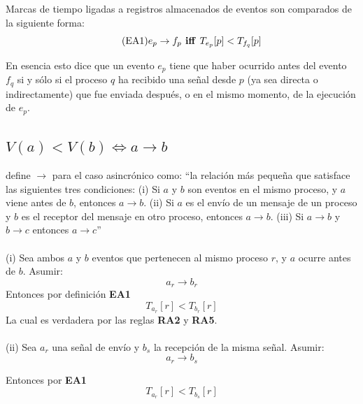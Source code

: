 \documentclass[12pt, times]{simauth}
\begin{document}
Marcas de tiempo ligadas a registros almacenados de eventos son comparados de la siguiente forma:
\begin{equation}
    \tag{EA1}
    e_p \to f_p \textnormal{\textbf{ iff }} T_{e_p}[p] < T_{f_q}[p]
\end{equation}

En esencia esto dice que un evento $e_p$ tiene que haber ocurrido antes del evento $f_q$ si y sólo si el proceso $q$ ha recibido una señal desde $p$ (ya sea directa o indirectamente) que fue enviada después, o en el mismo momento, de la ejecución de $e_p$.


\subsection{$V(a) < V(b) \Longleftrightarrow a \to b$} \label{primeprueba}
\cite{lamport} define $\to$ para el caso asincrónico como: ``la relación más pequeña que satisface las siguientes tres condiciones: (i) Si $a$ y $b$ son eventos en el mismo proceso, y $a$ viene antes de $b$, entonces $a \to b$. (ii) Si $a$ es el envío de un mensaje de un proceso y $b$ es el receptor del mensaje en otro proceso, entonces $a \to b$. (iii) Si $a \to b$ y $b \to c$ entonces $a \to c$''

\noindent \paragraph{}(i) Sea ambos $a$ y $b$ eventos que pertenecen al mismo proceso $r$, y $a$ ocurre antes de $b$. Asumir: 
\begin{equation}
a_r \to b_r
\end{equation}
Entonces por definición \textbf{EA1} 
\begin{equation} \label{eq:2}
T_{a_r}[r] < T_{b_r}[r]
\end{equation}
La cual es verdadera por las reglas \textbf{RA2} y \textbf{RA5}.


\noindent \paragraph{} (ii) Sea $a_r$ una señal de envío y $b_s$ la recepción de la misma señal. Asumir:
\begin{equation}
    a_r \to b_s
\end{equation}

Entonces por \textbf{EA1}
\begin{equation}
T_{a_r}[r] < T_{b_s}[r]
\end{equation}
\end{document}
